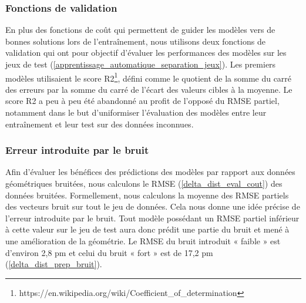 \subsubsection{Fonctions de validation}

\label{delta_dist_eval_valid}


\par En plus des fonctions de coût qui permettent de guider les modèles vers de bonnes solutions lors de l'entraînement, nous utilisons deux fonctions de validation qui ont pour objectif d'évaluer les performances des modèles sur les jeux de test (\ref{apprentissage_automatique_separation_jeux}). Les premiers modèles utilisaient le score R2\footnote{https://en.wikipedia.org/wiki/Coefficient\_of\_determination}, défini comme le quotient de la somme du carré des erreurs par la somme du carré de l'écart des valeurs cibles à la moyenne. Le score R2 a peu à peu été abandonné au profit de l'opposé du RMSE partiel, notamment dans le but d'uniformiser l'évaluation des modèles entre leur entraînement et leur test sur des données inconnues.

\subsubsection{Erreur introduite par le bruit}
\label{delta_dist_eval_rmse_bruit}


\par Afin d'évaluer les bénéfices des prédictions des modèles par rapport aux données géométriques bruitées, nous calculons le RMSE (\ref{delta_dist_eval_cout}) des données bruitées. Formellement, nous calculons la moyenne des RMSE partiels des vecteurs bruit sur tout le jeu de données. Cela nous donne une idée précise de l'erreur introduite par le bruit. Tout modèle possédant un RMSE partiel inférieur à cette valeur sur le jeu de test aura donc prédit une partie du bruit et mené à une amélioration de la géométrie. Le RMSE du bruit introduit « faible » est d'environ 2,8 pm et celui du bruit « fort » est de 17,2 pm (\ref{delta_dist_prep_bruit}).	